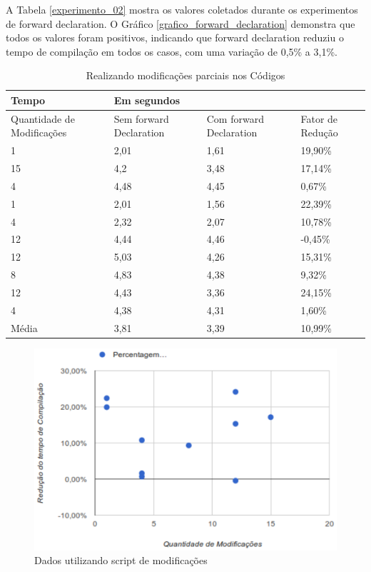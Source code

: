 A Tabela \ref{experimento_02} mostra os valores coletados durante
 os experimentos de forward declaration. O Gráfico
 \ref{grafico_forward_declaration} demonstra que todos os valores
 foram positivos, indicando que forward declaration reduziu o tempo
 de compilação em todos os casos, com uma variação de 0,5\% a 3,1\%.




\begin{table}[h]
\centering
\begin{tabular}{|p{3cm}|p{3cm}|p{3cm}|p{3cm}|}
\hline
Tempo      & \multicolumn{3}{l|}{Em segundos}    \\ \hline
Quantidade de Modificações & Sem forward Declaration  & Com forward Declaration & Fator de Redução\\ \hline
1  & 2,01 & 1,61 & 19,90\% \\ \hline
15 & 4,2  & 3,48 & 17,14\% \\ \hline
4  & 4,48 & 4,45 & 0,67\% \\ \hline
1  & 2,01 & 1,56 & 22,39\% \\ \hline
4  & 2,32 & 2,07 & 10,78\% \\ \hline
12 & 4,44 & 4,46 & -0,45\% \\ \hline
12 & 5,03 & 4,26 & 15,31\% \\ \hline
8  & 4,83 & 4,38 & 9,32\% \\ \hline
12 & 4,43 & 3,36 & 24,15\% \\ \hline
4  & 4,38 & 4,31 & 1,60\% \\ \hline
Média  & 3,81  & 3,39  & 10,99\% \\ \hline 
\end{tabular}
\caption{Realizando modificações parciais nos Códigos}
\label{amostas_experimento_03}
\end{table}


\begin{figure}[h]
    \centering
        \includegraphics[keepaspectratio=true,scale=1]{figuras/forward_declaration2.eps}
    \caption{Dados utilizando script de modificações}
    \label{grafico_forward_declaration2}
\end{figure}

